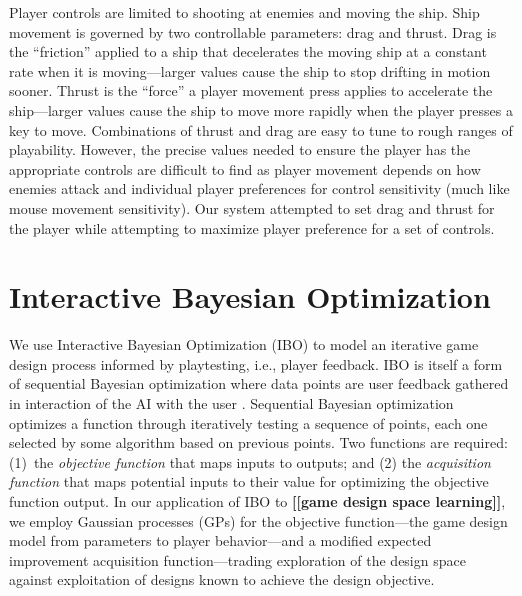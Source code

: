 \documentclass{sig-alternate}
\newcommand{\mytodo}[1]{\textbf{[[#1]]}}
\begin{document}
Player controls are limited to shooting at enemies and moving the ship. 
Ship movement is governed by two controllable parameters: drag and thrust. Drag is the ``friction'' applied to a ship that decelerates the moving ship at a constant rate when it is moving---larger values cause the ship to stop drifting in motion sooner. Thrust is the ``force'' a player movement press applies to accelerate the ship---larger values cause the ship to move more rapidly when the player presses a key to move. 
%
Combinations of thrust and drag are easy to tune to rough ranges of playability. However, the precise values needed to ensure the player has the appropriate controls are difficult to find as player movement depends on how enemies attack and individual player preferences for control sensitivity (much like mouse movement sensitivity). 
Our system attempted to set drag and thrust for the player while attempting to maximize player preference for a set of controls.



\section{Interactive Bayesian Optimization}

We use Interactive Bayesian Optimization (IBO) to model an iterative game design process informed by playtesting, i.e., player feedback. IBO is itself a form of sequential Bayesian optimization where data points are user feedback gathered in interaction of the AI with the user \cite{brochu2010:thesis}.
Sequential Bayesian optimization optimizes a function through iteratively testing a sequence of points, each one selected by some algorithm based on previous points. 
Two functions are required: (1)~the \textit{objective function} that maps inputs to outputs; and (2) the \textit{acquisition function} that maps potential inputs to their value for optimizing the objective function output. 
%
In our application of IBO to \mytodo{game design space learning}, we employ Gaussian processes (GPs) for the objective function---the game design model from parameters to player behavior---and a modified expected improvement acquisition function---trading exploration of the design space against exploitation of designs known to achieve the design objective.
\end{document}
